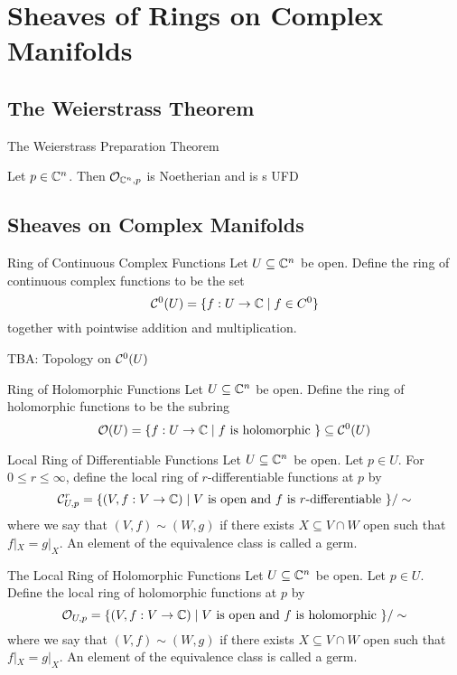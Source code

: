 \documentclass[a4paper]{article}
\begin{document}
\pagebreak
\section{Sheaves of Rings on Complex Manifolds}
\subsection{The Weierstrass Theorem}
\begin{thm}{The Weierstrass Preparation Theorem}{}
\end{thm}

\begin{prp}{}{} Let $p\in\mathbb{C}^n$. Then $\mathcal{O}_{\mathbb{C}^n,p}$ is Noetherian and is s UFD
\end{prp}

\subsection{Sheaves on Complex Manifolds}
\begin{defn}{Ring of Continuous Complex Functions}{} Let $U\subseteq\mathbb{C}^n$ be open. Define the ring of continuous complex functions to be the set $$\mathcal{C}^0(U)=\{f:U\to\mathbb{C}\;|\;f\in C^0\}$$ together with pointwise addition and multiplication. 
\end{defn}

TBA: Topology on $\mathcal{C}^0(U)$

\begin{defn}{Ring of Holomorphic Functions}{} Let $U\subseteq\mathbb{C}^n$ be open. Define the ring of holomorphic functions to be the subring $$\mathcal{O}(U)=\{f:U\to\mathbb{C}\;|\;f\text{ is holomorphic }\}\subseteq\mathcal{C}^0(U)$$
\end{defn}

\begin{defn}{Local Ring of Differentiable Functions}{} Let $U\subseteq\mathbb{C}^n$ be open. Let $p\in U$. For $0\leq r\leq\infty$, define the local ring of $r$-differentiable functions at $p$ by $$\mathcal{C}_{U,p}^r=\{(V,f:V\to\mathbb{C})\;|\;V\text{ is open and }f\text{ is }r\text{-differentiable }\}/\sim$$ where we say that $(V,f)\sim(W,g)$ if there exists $X\subseteq V\cap W$ open such that $f|_X=g|_X$. An element of the equivalence class is called a germ. 
\end{defn}

\begin{defn}{The Local Ring of Holomorphic Functions}{} Let $U\subseteq\mathbb{C}^n$ be open. Let $p\in U$. Define the local ring of holomorphic functions at $p$ by $$\mathcal{O}_{U,p}=\{(V,f:V\to\mathbb{C})\;|\;V\text{ is open and }f\text{ is holomorphic }\}/\sim$$ where we say that $(V,f)\sim(W,g)$ if there exists $X\subseteq V\cap W$ open such that $f|_X=g|_X$. An element of the equivalence class is called a germ. 
\end{defn}
\end{document}
